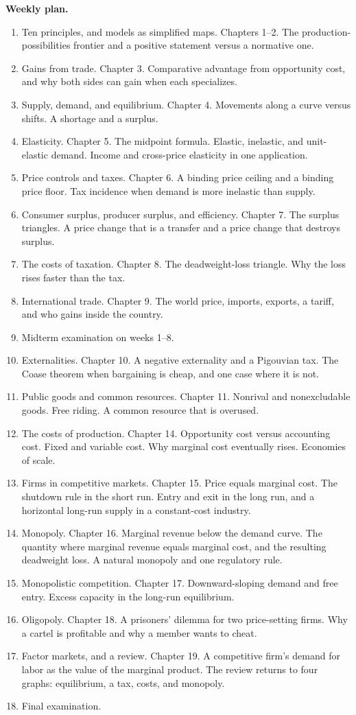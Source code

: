 \documentclass[11pt]{article}
\begin{document}
\textbf{Weekly plan.}
\begin{enumerate}
\item Ten principles, and models as simplified maps. Chapters 1--2. The production-possibilities frontier and a positive statement versus a normative one.
\item Gains from trade. Chapter 3. Comparative advantage from opportunity cost, and why both sides can gain when each specializes.
\item Supply, demand, and equilibrium. Chapter 4. Movements along a curve versus shifts. A shortage and a surplus.
\item Elasticity. Chapter 5. The midpoint formula. Elastic, inelastic, and unit-elastic demand. Income and cross-price elasticity in one application.
\item Price controls and taxes. Chapter 6. A binding price ceiling and a binding price floor. Tax incidence when demand is more inelastic than supply.
\item Consumer surplus, producer surplus, and efficiency. Chapter 7. The surplus triangles. A price change that is a transfer and a price change that destroys surplus.
\item The costs of taxation. Chapter 8. The deadweight-loss triangle. Why the loss rises faster than the tax.
\item International trade. Chapter 9. The world price, imports, exports, a tariff, and who gains inside the country.
\item Midterm examination on weeks 1--8.
\item Externalities. Chapter 10. A negative externality and a Pigouvian tax. The Coase theorem when bargaining is cheap, and one case where it is not.
\item Public goods and common resources. Chapter 11. Nonrival and nonexcludable goods. Free riding. A common resource that is overused.
\item The costs of production. Chapter 14. Opportunity cost versus accounting cost. Fixed and variable cost. Why marginal cost eventually rises. Economies of scale.
\item Firms in competitive markets. Chapter 15. Price equals marginal cost. The shutdown rule in the short run. Entry and exit in the long run, and a horizontal long-run supply in a constant-cost industry.
\item Monopoly. Chapter 16. Marginal revenue below the demand curve. The quantity where marginal revenue equals marginal cost, and the resulting deadweight loss. A natural monopoly and one regulatory rule.
\item Monopolistic competition. Chapter 17. Downward-sloping demand and free entry. Excess capacity in the long-run equilibrium.
\item Oligopoly. Chapter 18. A prisoners' dilemma for two price-setting firms. Why a cartel is profitable and why a member wants to cheat.
\item Factor markets, and a review. Chapter 19. A competitive firm's demand for labor as the value of the marginal product. The review returns to four graphs: equilibrium, a tax, costs, and monopoly.
\item Final examination.
\end{enumerate}
\end{document}
